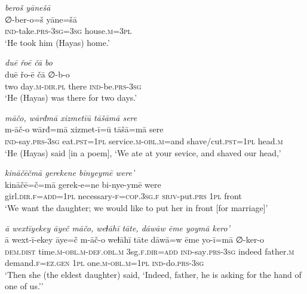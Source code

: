 \ea \label{ŽH.51}
\textit{beroš yānešā} \\ 
\gll ∅-ber-o=š yāne=šā \\ 
 \textsc{ind-}take\textsc{.prs}\textsc{-3sg}\textsc{=3sg} house\textsc{.m}\textsc{=3pl} \\ 
\glt `He took him (Hayas) home.'
\z 
 
\ea \label{ŽH.52}
\textit{duē řoē čā bo} \\ 
\gll duē řo-ē čā ∅-b-o \\ 
 two day\textsc{.m}\textsc{-dir}\textsc{.pl} there \textsc{ind-}be\textsc{.prs}\textsc{-3sg} \\ 
\glt `He (Hayas) was there for two days.'
\z 
 
\ea \label{ŽH.55}
\textit{māčo, wārđmā xizmetīū tāšāmā sere} \\ 
\gll m-āč-o wārđ=mā xizmet-ī=ū tāšā=mā sere \\ 
 \textsc{ind-}say\textsc{.prs}\textsc{-3sg} eat\textsc{.pst}\textsc{=1pl} service\textsc{.m}\textsc{-obl}\textsc{.m}=and shave/cut\textsc{.pst}\textsc{=1pl} head\textsc{.m} \\ 
\glt `He (Hayas) said [in a poem], ‘We ate at your sevice, and shaved our head,'
\z 
 
\ea \label{ŽH.56}
\textit{kināčēčmā gerekene binyeymē were’} \\ 
\gll kināčē=č=mā gerek-e=ne bi-nye-ymē were \\ 
 girl\textsc{.dir}\textsc{\textsc{.f}}\textsc{=add}\textsc{=1pl} necessary\textsc{-f}\textsc{=cop}\textsc{.3sg}\textsc{\textsc{.f}} \textsc{sbjv-}put\textsc{.prs} \textsc{1pl} front \\ 
\glt `We want the daughter; we would like to put her in front [for marriage]'
\z 
 
\ea \label{ŽH.57}
\textit{ā wextīyekey āyeč māčo, weɫāhī tāte, dāwāw ēme yoymā kero’} \\ 
\gll ā wext-ī-ekey āye=č m-āč-o weɫāhī tāte dāwā=w ēme yo-ī=mā ∅-ker-o \\ 
 \textsc{dem.dist} time\textsc{.m}\textsc{-obl}\textsc{.m}\textsc{-def}\textsc{.obl}\textsc{.m} 3sg\textsc{\textsc{.f}}\textsc{.dir}\textsc{=add} \textsc{ind-}say\textsc{.prs}\textsc{-3sg} indeed father\textsc{.m} demand\textsc{\textsc{.f}}\textsc{=ez}\textsc{.gen} \textsc{1pl} one\textsc{.m}\textsc{-obl}\textsc{.m}\textsc{=1pl} \textsc{ind-}do\textsc{.prs}\textsc{-3sg} \\ 
\glt `Then she (the eldest daughter) said, ‘Indeed, father, he is asking for the hand of one of us.’'
\z 
 
